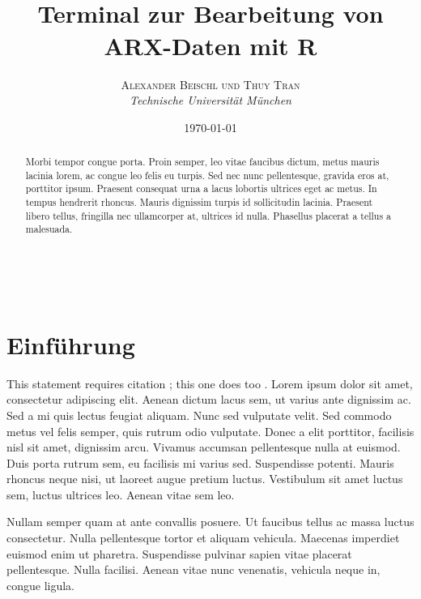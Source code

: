 \documentclass[a4paper, 12pt]{report} %
\title{\textbf{}\\ %
Terminal zur Bearbeitung von ARX-Daten mit R} %
\author{\textsc{Alexander Beischl und Thuy Tran} %
\\{\textit{Technische Universität München}}} %
\date{\today} %
\makeatletter
\renewcommand{\maketitle}{ %
\begin{flushright} %
{\LARGE\@title} %

\vspace{50pt} %

{\large\@author} %
\\\@date %

\vspace{40pt} %
\end{flushright}
}
\makeatother
\begin{document}
\maketitle %


\renewcommand{\abstractname}{Zusammenfassung} %

\begin{abstract}
Morbi tempor congue porta. Proin semper, leo vitae faucibus dictum, metus mauris lacinia lorem, ac congue leo felis eu turpis. Sed nec nunc pellentesque, gravida eros at, porttitor ipsum. Praesent consequat urna a lacus lobortis ultrices eget ac metus. In tempus hendrerit rhoncus. Mauris dignissim turpis id sollicitudin lacinia. Praesent libero tellus, fringilla nec ullamcorper at, ultrices id nulla. Phasellus placerat a tellus a malesuada.
\end{abstract}


\vspace{30pt} %


\chapter{Einführung}\label{einführung}

This statement requires citation \cite{latexcompanion}; this one does too \cite{einstein}. Lorem ipsum dolor sit amet, consectetur adipiscing elit. Aenean dictum lacus sem, ut varius ante dignissim ac. Sed a mi quis lectus feugiat aliquam. Nunc sed vulputate velit. Sed commodo metus vel felis semper, quis rutrum odio vulputate. Donec a elit porttitor, facilisis nisl sit amet, dignissim arcu. Vivamus accumsan pellentesque nulla at euismod. Duis porta rutrum sem, eu facilisis mi varius sed. Suspendisse potenti. Mauris rhoncus neque nisi, ut laoreet augue pretium luctus. Vestibulum sit amet luctus sem, luctus ultrices leo. Aenean vitae sem leo.

Nullam semper quam at ante convallis posuere. Ut faucibus tellus ac massa luctus consectetur. Nulla pellentesque tortor et aliquam vehicula. Maecenas imperdiet euismod enim ut pharetra. Suspendisse pulvinar sapien vitae placerat pellentesque. Nulla facilisi. Aenean vitae nunc venenatis, vehicula neque in, congue ligula.
\end{document}

